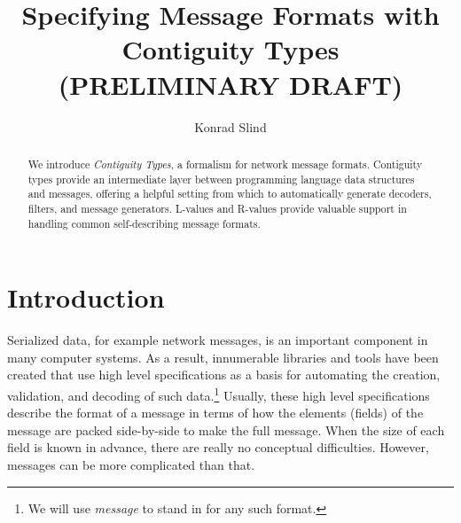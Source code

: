 \documentclass[svgnames]{llncs}
\begin{document}
\title{Specifying Message Formats with \\ Contiguity Types  \\ (PRELIMINARY DRAFT)}

\author{Konrad Slind}
\maketitle

\begin{abstract}
We introduce \emph{Contiguity Types}, a formalism for network message
formats. Contiguity types provide an intermediate layer between
programming language data structures and messages, offering a helpful
setting from which to automatically generate decoders, filters, and
message generators. L-values and R-values provide valuable
support in handling common self-describing message formats.
\end{abstract}



\section{Introduction}\label{sec:intro}

Serialized data, for example network messages, is an important
component in many computer systems.  As a result, innumerable
libraries and tools have been created that use high level
specifications as a basis for automating the creation, validation, and
decoding of such data.\footnote{We will use \emph{message} to stand in
  for any such format.} Usually, these high level specifications
describe the format of a message in terms of how the elements (fields)
of the message are packed side-by-side to make the full message. When
the size of each field is known in advance, there are really no
conceptual difficulties. However, messages can be more complicated
than that.
\end{document}
